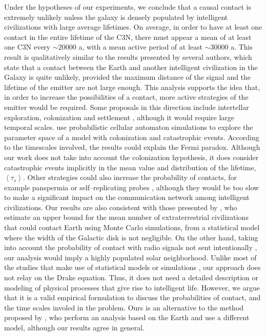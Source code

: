 \documentclass[crop]{CSLB}
\newcommand{\ceti}{C3N}
\begin{document}
Under the hypotheses of our experiments, we conclude that a causal
contact is extremely unlikely unless the galaxy is densely populated
by intelligent civilizations with large average lifetimes.
%
On average, in order to have at least one contact in the entire lifetime
of the \ceti{}, there must appear a mean of at least one \ceti{}
every $\sim$20000 a, with a mean active period of at least
$\sim$30000 a.
%
This result is qualitatively similar to the results presented by
several authors, which state that a contact between the Earth and
another intelligent civilization in the Galaxy is quite unlikely,
provided the maximum distance of the signal and the lifetime of the
emitter are not large enough.
%
This analysis supports the idea that, in order to increase the
possibilities of a contact, more active strategies of the emitter
would be required.
%
Some proposals in this direction include intertellar exploration,
colonization and settlement \citep{brin_great_1983, Dosovic2019,
galera_invasion_2019}, although it would require large temporal
scales.
%
\citet{Dosovic2019} use probabilistic cellular automaton simulations
to explore the parameter space of a model with colonization and
catastrophic events.
%
According to the timescales involved, the results could explain the
Fermi paradox.
%
Although our work does not take into account the colonization
hypothesis, it does consider catastrophic events implicitly in the
mean value and distribution of the lifetime, $\left<\tau_s\right>$.
%
Other strategies could also increase the probability of contacts, for
example panspermia \citep[e.g.,][]{starling_virulence_2013} or
self--replicating probes \citep[e.g.,][]{barlow_galactic_2013},
although they would be too slow to make a significant impact on the
communication network among intelligent civilizations.
%
Our results are also consistent with those presented by
\citet{grimaldi_signal_2017}, who estimate an upper bound for the mean
number of extraterrestrial civilizations that could contact Earth
using Monte Carlo simulations, from a statistical model where the width
of the Galactic disk is not negligible.
%
On the other hand, taking into account the probability of contact with
radio signals not sent intentionally \citep{horvat_calculating_2007},
our analysis would imply a highly populated solar neighborhood.
%
Unlike most 
of the studies that make use of statistical models or
simulations \citep{cirkovic_temporal_2004, smith_broadcasting_2009,
bloetscher_using_2019}, our approach does not relay on the Drake
equation.
%
Thus, it does not need
a detailed description or modeling of physical processes that give rise to
intelligent life.
%
However, we argue that it is a valid empirical formulation to discuss
the probabilities of contact, and the time scales involed in the
problem.
%
Ours is an alternative to the method proposed by
\citet{balbi_impact_2018}, who perform an analysis based on the Earth
and use a different model, although our results agree in general.
\end{document}
